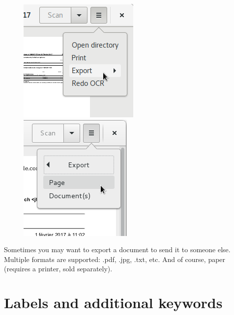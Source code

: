 \documentclass[10pt,a4paper]{article}
\begin{document}
\begin{figure}[h]
	\centering
	\includegraphics[scale=0.5]{data/paperwork_export_0001.png}
	\includegraphics[scale=0.5]{data/paperwork_export_0002.png}
\end{figure}

Sometimes you may want to export a document to send it to someone else.
Multiple formats are supported: .pdf, .jpg, .txt, etc. And of course, paper
(requires a printer, sold separately).


\section{Labels and additional keywords}
\end{document}
